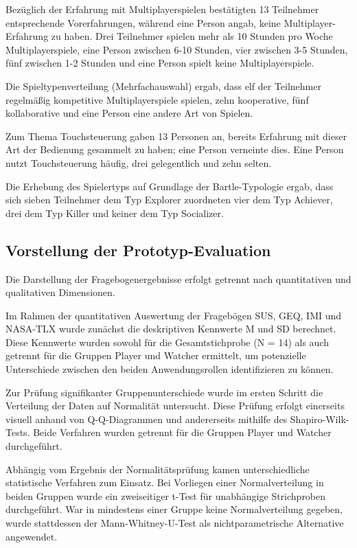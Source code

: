 Bezüglich der Erfahrung mit Multiplayerspielen bestätigten 13 Teilnehmer entsprechende Vorerfahrungen, während eine Person angab, keine Multiplayer-Erfahrung zu haben. Drei Teilnehmer spielen mehr als 10 Stunden pro Woche Multiplayerspiele, eine Person zwischen 6-10 Stunden, vier zwischen 3-5 Stunden, fünf zwischen 1-2 Stunden und eine Person spielt keine Multiplayerspiele.

Die Spieltypenverteilung (Mehrfachauswahl) ergab, dass elf der Teilnehmer regelmäßig kompetitive Multiplayerspiele spielen, zehn kooperative, fünf kollaborative und eine Person eine andere Art von Spielen.

Zum Thema Touchsteuerung gaben 13 Personen an, bereits Erfahrung mit dieser Art der Bedienung gesammelt zu haben; eine Person verneinte dies. Eine Person nutzt Touchsteuerung häufig, drei gelegentlich und zehn selten.

Die Erhebung des Spielertyps auf Grundlage der Bartle-Typologie ergab, dass sich sieben Teilnehmer dem Typ Explorer zuordneten vier dem Typ Achiever, drei dem Typ Killer und keiner dem Typ Socializer.

\subsection{Vorstellung der Prototyp-Evaluation}

Die Darstellung der Fragebogenergebnisse erfolgt getrennt nach quantitativen und qualitativen Dimensionen.

Im Rahmen der quantitativen Auswertung der Fragebögen  \ac{SUS}, \ac{GEQ}, \ac{IMI} und \ac{NASA-TLX} wurde zunächst die deskriptiven Kennwerte \ac{M} und \ac{SD} berechnet. Diese Kennwerte wurden sowohl für die Gesamtstichprobe (N = 14) als auch getrennt für die Gruppen Player und Watcher ermittelt, um potenzielle Unterschiede zwischen den beiden Anwendungsrollen identifizieren zu können.

Zur Prüfung signifikanter Gruppenunterschiede wurde im ersten Schritt die Verteilung der Daten auf Normalität untersucht. Diese Prüfung erfolgt einerseits visuell anhand von \ac{Q-Q}-Diagrammen und andererseits mithilfe des Shapiro-Wilk-Tests. Beide Verfahren wurden getrennt für die Gruppen Player und Watcher durchgeführt.

Abhängig vom Ergebnis der Normalitätsprüfung kamen unterschiedliche statistische Verfahren zum Einsatz. Bei Vorliegen einer Normalverteilung in beiden Gruppen wurde ein zweiseitiger t-Test für unabhängige Strichproben durchgeführt. War in mindestens einer Gruppe keine Normalverteilung gegeben, wurde stattdessen der Mann-Whitney-U-Test als nichtparametrische Alternative angewendet.

